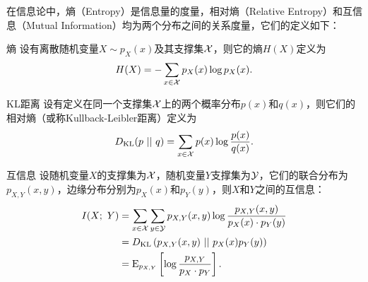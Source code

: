 在信息论中，熵（Entropy）是信息量的度量，相对熵（Relative Entropy）和互信息（Mutual Information）均为两个分布之间的关系度量，它们的定义如下\citep{cover2012elements}：
\begin{definition}{熵}
  设有离散随机变量$X \sim p_X(x)$及其支撑集$\mathcal{X}$，则它的熵$H(X)$定义为
  \begin{equation}
    H(X) = -\sum_{x\in\mathcal{X}} p_X(x) \log p_X(x).
  \end{equation}
  \label{def:entropy}
\end{definition}
\begin{definition}{KL距离}
  设有定义在同一个支撑集$\mathcal{X}$上的两个概率分布$p(x)$和$q(x)$，则它们的相对熵（或称Kullback-Leibler距离）定义为
  \begin{equation}
    D_{\text{KL}}(p~||~q) = \sum_{x\in\mathcal{X}} p(x)\log \frac{p(x)}{q(x)}.
  \end{equation}
  \label{def:relative-entropy}
\end{definition}
\begin{definition}{互信息}
  设随机变量$X$的支撑集为$\mathcal{X}$，随机变量$Y$支撑集为$\mathcal{Y}$，它们的联合分布为$p_{X,Y}(x, y)$，边缘分布分别为$p_X(x)$和$p_Y(y)$，则$X$和$Y$之间的互信息：
  \begin{equation}
    \begin{split}
      I(X;~Y) &= \sum_{x\in\mathcal{X}}\sum_{y\in\mathcal{Y}} 
      p_{X,Y}(x,y) \log\frac{p_{X,Y}(x,y)}{p_X(x) \cdot p_Y(y)}  \\
            &= D_{\text{KL}}\left( p_{X,Y}(x,y)~||~p_X(x) p_Y(y) \right) \\
            &= \text{E}_{p_{X,Y}} \left[ 
              \log\frac{p_{X,Y}}{p_X \cdot p_Y}
              \right].
    \end{split}
    \label{eq:mutual-information}
  \end{equation}
  \label{def:mutual-information}
\end{definition}

